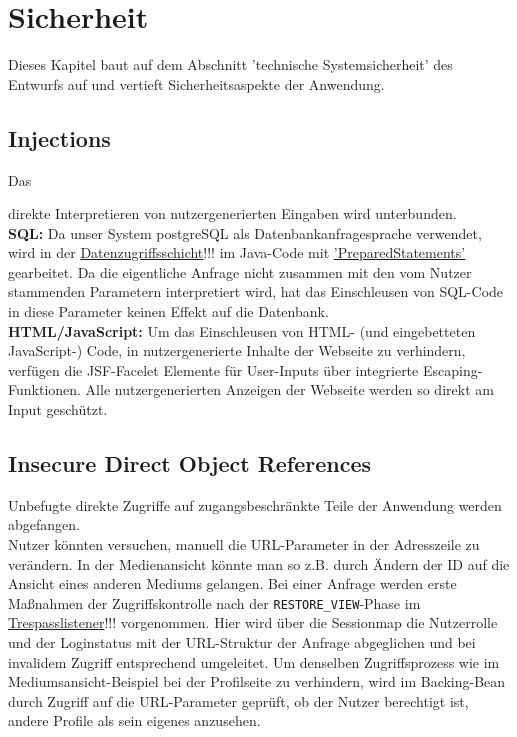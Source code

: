 \documentclass{article}
\begin{document}


\section{Sicherheit}
Dieses Kapitel baut auf dem Abschnitt 'technische Systemsicherheit' des Entwurfs auf und vertieft Sicherheitsaspekte der Anwendung.
\subsection{Injections}
\hypertarget{Injections}{Das} direkte Interpretieren von nutzergenerierten Eingaben wird unterbunden.\\
\textbf{SQL:} Da unser System postgreSQL als Datenbankanfragesprache verwendet, wird in der \hyperlink{DAOs}{Datenzugriffsschicht}!!! im Java-Code mit \hyperlink{https://docs.oracle.com/javase/7/docs/api/java/sql/PreparedStatement.html}{'PreparedStatements'} gearbeitet. Da die eigentliche Anfrage nicht zusammen mit den vom Nutzer stammenden Parametern interpretiert wird, hat das Einschleusen von SQL-Code in diese Parameter keinen Effekt auf die Datenbank.\\
\textbf{HTML/JavaScript:} \hypertarget{XSS}{Um} das Einschleusen von HTML- (und eingebetteten JavaScript-) Code, in nutzergenerierte Inhalte der Webseite zu verhindern, verfügen die JSF-Facelet Elemente für User-Inputs über integrierte Escaping-Funktionen. Alle nutzergenerierten Anzeigen der Webseite werden so direkt am Input geschützt.
\subsection{Insecure Direct Object References}
Unbefugte direkte Zugriffe auf zugangsbeschränkte Teile der Anwendung werden abgefangen.\\ 
Nutzer könnten versuchen, manuell die URL-Parameter in der Adresszeile zu verändern. In der Medienansicht könnte man so z.B. durch Ändern der ID auf die Ansicht eines anderen Mediums gelangen. Bei einer Anfrage werden erste Maßnahmen der Zugriffskontrolle nach der \texttt{RESTORE\_VIEW}-Phase im \hyperlink{PhaseListener}{Trespasslistener}!!! vorgenommen. Hier wird über die Sessionmap die Nutzerrolle und der Loginstatus mit der URL-Struktur der Anfrage abgeglichen und bei invalidem Zugriff entsprechend umgeleitet. Um denselben Zugriffsprozess wie im Mediumsansicht-Beispiel bei der Profilseite zu verhindern, wird im Backing-Bean durch Zugriff auf die URL-Parameter geprüft, ob der Nutzer berechtigt ist, andere Profile als sein eigenes anzusehen. 
\end{document}
